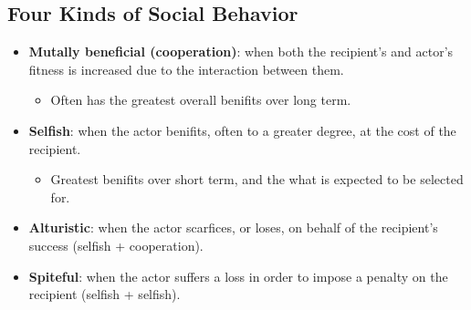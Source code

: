 \documentclass[12pt,a4paper]{article}
\begin{document}
\subsection{Four Kinds of Social Behavior}
\begin{itemize}
    \item \textbf{Mutally beneficial (cooperation)}: when both the recipient's and actor's fitness is increased due to the interaction between them.
        \begin{itemize}
            \item Often has the greatest overall benifits over long term.
        \end{itemize}
    \item \textbf{Selfish}: when the actor benifits, often to a greater degree, at the cost of the recipient.
        \begin{itemize}
            \item Greatest benifits over short term, and the what is expected to be selected for.
        \end{itemize}
    \item \textbf{Alturistic}: when the actor scarfices, or loses, on behalf of the recipient's success (selfish + cooperation).
    \item \textbf{Spiteful}: when the actor suffers a loss in order to impose a penalty on the recipient (selfish + selfish).
\end{itemize}
\end{document}
